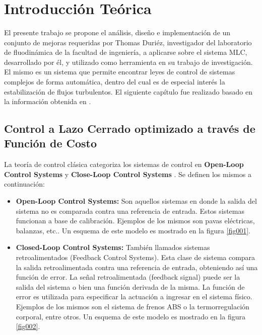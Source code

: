\documentclass[a4paper,10pt]{article}
\title{  }
\begin{document}
	\maketitle %
	\newpage

	\tableofcontents
	\newpage

    \section{Introducción Teórica} \label{sec:intro}
        El presente trabajo se propone el análisis, diseño e implementación de un conjunto de mejoras requeridas por Thomas Duriéz,
        investigador del laboratorio de fluodinámica de la facultad de ingeniería, a aplicarse sobre el sistema MLC, desarrollado por él,
        y utilizado como herramienta en su trabajo de investigación. El mismo es un sistema que permite encontrar leyes de control de 
        sistemas complejos de forma automática, dentro del cual es de especial interés la estabilización de flujos turbulentos.
        El siguiente capítulo fue realizado basado en la información obtenida en \cite{Duriez2016}.

        \subsection{Control a Lazo Cerrado optimizado a través de Función de Costo} \label{sec:close_loop}
        La teoría de control clásica categoriza los sistemas de control en \textbf{Open-Loop Control Systems} y
        \textbf{Close-Loop Control Systems} \cite{Ogata2002}. Se definen los mismos a continuación:

        \begin{itemize}
            \item \textbf{Open-Loop Control Systems:} Son aquellos sistemas en donde la salida del sistema no es comparada contra una
            referencia de entrada. Estos sistemas funcionan a base de calibración. Ejemplos de los mismos son pavas eléctricas,
            balanzas, etc.. Un esquema de este modelo es mostrado en la figura \ref{fig001}.
            \item \textbf{Closed-Loop Control Systems:} También llamados sistemas retroalimentados (Feedback Control Systems). Esta clase
            de sistema compara la salida retroalimentada contra una referencia de entrada, obteniendo así una función de error. La señal
            retroalimentada (feedback signal) puede ser la salida del sistema o bien una función derivada de la misma. La función de error
            es utilizada para especificar la actuación a ingresar en el sistema físico. Ejemplos de los mismos son el sistema de frenos
            ABS o la termorregulación corporal, entre otros. Un esquema de este modelo es mostrado en la figura \ref{fig002}.
        \end{itemize}
\end{document}
